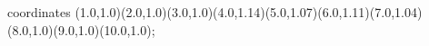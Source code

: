 					coordinates { (1.0,1.0)(2.0,1.0)(3.0,1.0)(4.0,1.14)(5.0,1.07)(6.0,1.11)(7.0,1.04)(8.0,1.0)(9.0,1.0)(10.0,1.0)};